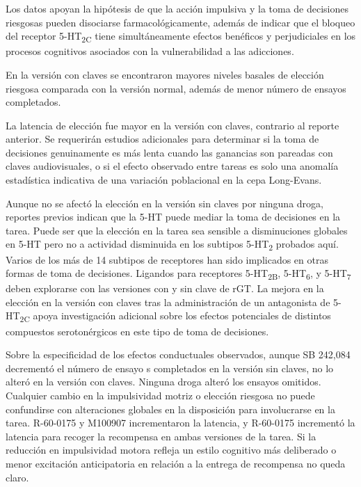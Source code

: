 \documentclass[a4paper,12pt]{article}
\begin{document}
Los datos apoyan la hipótesis de que la acción impulsiva y la toma de decisiones riesgosas pueden disociarse farmacológicamente, además de indicar que el bloqueo del receptor 5-HT\textsubscript{2C} tiene simultáneamente efectos benéficos y perjudiciales en los procesos cognitivos asociados con la vulnerabilidad a las adicciones.

En la versión con claves se encontraron mayores niveles basales de elección riesgosa comparada con la versión normal, además de menor número de ensayos completados.

La latencia de elección fue mayor en la versión con claves, contrario al reporte anterior. Se requerirán estudios adicionales para determinar si la toma de decisiones genuinamente es más lenta cuando las ganancias son pareadas con claves audiovisuales, o si el efecto observado entre tareas es solo una anomalía estadística indicativa de una variación poblacional en la cepa Long-Evans.

Aunque no se afectó la elección en la versión sin claves por ninguna droga, reportes previos indican que la 5-HT puede mediar la toma de decisiones en la tarea. Puede ser que la elección en la tarea sea sensible a disminuciones globales en 5-HT pero no a actividad disminuida en los subtipos 5-HT\textsubscript{2} probados aquí. Varios de los más de 14 subtipos de receptores han sido implicados en otras formas de toma de decisiones. Ligandos para receptores 5-HT\textsubscript{2B}, 5-HT\textsubscript{6}, y 5-HT\textsubscript{7} deben explorarse con las versiones con y sin clave de rGT. La mejora en la elección en la versión con  claves tras la administración de un antagonista de 5-HT\textsubscript{2C} apoya investigación adicional sobre los efectos potenciales de distintos compuestos serotonérgicos en este tipo de toma de decisiones.

Sobre la especificidad de los efectos conductuales observados, aunque SB 242,084 decrementó el número de ensayo s completados en la versión sin claves, no lo alteró en la versión con claves. Ninguna droga alteró los ensayos omitidos. Cualquier cambio en la impulsividad motriz o elección riesgosa no puede confundirse con alteraciones globales en la disposición para involucrarse en la tarea. R-60-0175 y M100907 incrementaron la latencia, y R-60-0175 incrementó la latencia para recoger la recompensa en ambas versiones de la tarea. Si la reducción en impulsividad motora refleja un estilo cognitivo más deliberado o menor excitación anticipatoria en relación a la entrega de recompensa no queda claro.
\end{document}

